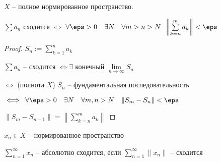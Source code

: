 
\begin{theorem} \thmslashn 
	
	$X$ -- полное нормированное пространство.
	
	$\sum a_n$ сходится $\iff $ $\forall{\eps > 0}\quad \exists{N}\quad \forall{m>n>N} \;\; \left\|\sum\limits_{k=n}^{m}a_k\right\| < \eps$

	\begin{proof} \thmslashn
		
		$S_n:= \sum\limits_{k=1}^{n} a_k$
		
		$\sum a_n$ -- сходится $\iff \exists $ конечный $\lim\limits_{n \to \infty} S_n$
		
		$\iff$ (полнота $X$) $S_n$ -- фундаментальная последовательность
		
		$\iff \; \forall{\eps > 0} \quad \exists{N} \quad \forall{m,n > N} \quad \|S_m - S_n\| < \eps$
	
	$\|S_m - S_{n - 1}\| = \left\|\sum\limits_{k =n}^{m}a_k\right\|$
	\end{proof}

\end{theorem}

\begin{definition} \thmslashn 
	
	$x_n \in X$ -- нормированное пространство

	$\sum\limits_{n = 1}^{\infty}x_n$ -- абсолютно сходится, если $\sum\limits_{n = 1}^{\infty}\|x_n\|$ -- сходится

\end{definition}


